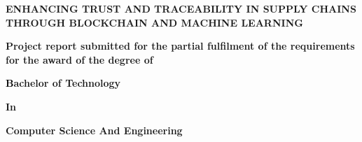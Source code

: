 
\thispagestyle{empty}
\singlespacing
\begin{titlepage}
\begin{center}
    \centering
     
      
  {{\Large \textbf{ENHANCING TRUST AND TRACEABILITY IN SUPPLY CHAINS 
  THROUGH BLOCKCHAIN AND MACHINE LEARNING}\par}}
     
    \vspace{0.2cm}
    {
    \textbf{\large Project report submitted for the partial fulfilment of the requirements for the award of the degree of } \par}


    {
    \textbf{\large\textcolor{black} Bachelor of Technology \\ \vspace{1mm} } \par}
    \vspace{1mm}
    {\textbf{\large In \\ \vspace{1mm} }\par}
    \vspace{1mm}
    {\textbf{\large Computer Science And Engineering \\ \vspace{1mm} } \par}



\end{center}
\end{titlepage}
